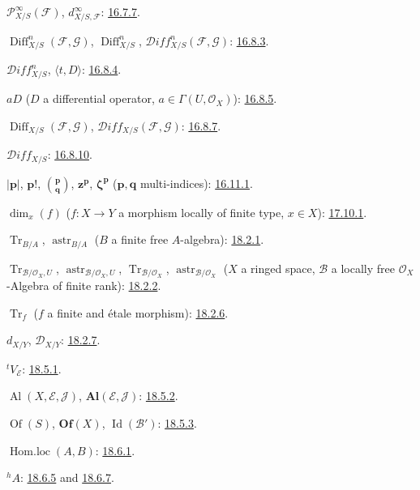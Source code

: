 $\mathcal{P}^{\infty}_{X/S}(\mathcal{F})$,
$d^{\infty}_{X/S,\mathcal{F}}$: {\hyperref[IV.16.7.7]{16.7.7}}.

$\operatorname{Diff}^{n}_{X/S}(\mathcal{F},\mathcal{G})$,
$\operatorname{Diff}^{n}_{X/S}$,
$\mathcal{D}iff^{n}_{X/S}(\mathcal{F},\mathcal{G})$:
{\hyperref[IV.16.8.3]{16.8.3}}.

$\mathcal{D}iff^{n}_{X/S}$, $\langle t,D\rangle$:
{\hyperref[IV.16.8.4]{16.8.4}}.

$aD$ ($D$ a differential operator, $a\in\Gamma(U,\mathcal{O}_X)$):
{\hyperref[IV.16.8.5]{16.8.5}}.

$\operatorname{Diff}_{X/S}(\mathcal{F},\mathcal{G})$,
$\mathcal{D}iff_{X/S}(\mathcal{F},\mathcal{G})$:
{\hyperref[IV.16.8.7]{16.8.7}}.

$\mathcal{D}iff_{X/S}$: {\hyperref[IV.16.8.10]{16.8.10}}.

$|\mathbf p|$, $\mathbf p!$, $\binom{\mathbf p}{\mathbf q}$,
$\mathbf z^{\mathbf p}$, $\boldsymbol\zeta^{\mathbf p}$
($\mathbf p,\mathbf q$ multi-indices): {\hyperref[IV.16.11.1]{16.11.1}}.

$\dim_x(f)$ ($f:X\to Y$ a morphism locally of finite type, $x\in X$):
{\hyperref[section:IV.17]{17.10.1}}.

$\operatorname{Tr}_{B/A}$, $\operatorname{astr}_{B/A}$
($B$ a finite free $A$-algebra): {\hyperref[IV.18.2.1]{18.2.1}}.

$\operatorname{Tr}_{\mathcal B/\mathcal O_X,U}$,
$\operatorname{astr}_{\mathcal B/\mathcal O_X,U}$,
$\operatorname{Tr}_{\mathcal B/\mathcal O_X}$,
$\operatorname{astr}_{\mathcal B/\mathcal O_X}$
($X$ a ringed space, $\mathcal B$ a locally free $\mathcal O_X$-Algebra
of finite rank): {\hyperref[IV.18.2.2]{18.2.2}}.

$\operatorname{Tr}_f$ ($f$ a finite and \'etale morphism): {\hyperref[IV.18.2.6]{18.2.6}}.

$d_{X/Y}$, $\mathcal D_{X/Y}$: {\hyperref[IV.18.2.7]{18.2.7}}.

${}^{t}V_{\mathcal E}$: {\hyperref[IV.18.5.1]{18.5.1}}.

$\operatorname{Al}(X,\mathcal E,\mathcal J)$, $\mathbf{Al}(\mathcal E,\mathcal J)$:
{\hyperref[IV.18.5.2]{18.5.2}}.

$\operatorname{Of}(S)$, $\mathbf{Of}(X)$, $\operatorname{Id}(\mathcal B')$: {\hyperref[IV.18.5.3]{18.5.3}}.

$\operatorname{Hom.loc}(A,B)$: {\hyperref[IV.18.6.1]{18.6.1}}.

${}^{h}A$: {\hyperref[IV.18.6.5]{18.6.5}} and {\hyperref[IV.18.6.7]{18.6.7}}.


